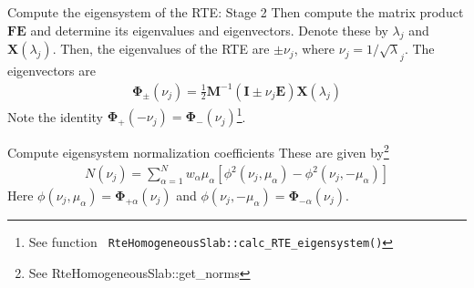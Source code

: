 \documentclass[14]{beamer}
\newcommand{\mvec}[1]{\mathbf{#1}}
\newcommand{\gvec}[1]{\boldsymbol{#1}}
\begin{document}
\begin{frame}{Compute the eigensystem of the RTE: Stage 2}
  Then compute the matrix product $\mvec{F}\mvec{E}$ and determine its
  eigenvalues and eigenvectors. Denote these by $\lambda_j$ and
  $\mvec{X}(\lambda_j)$.  Then, the eigenvalues of the RTE are $\pm
  \nu_j$, where $\nu_j = 1/\sqrt\lambda_j$. The eigenvectors are
  \begin{align}
    \gvec{\Phi}_\pm (\nu_j)
    = \frac{1}{2}\mvec{M}^{-1}
    (\mvec{I} \pm \nu_j\mvec{E})\mvec{X}(\lambda_j)
  \end{align}
  Note the identity $\gvec{\Phi}_+(-\nu_j) =
  \gvec{\Phi}_-(\nu_j)$\footnote{See function {\tt
      RteHomogeneousSlab::calc\_RTE\_eigensystem()}}.
\end{frame}

\begin{frame}{Compute eigensystem normalization coefficients}
  These are given by\footnote{See RteHomogeneousSlab::get\_norms}
  \begin{align}
    N(\nu_j) = \sum_{\alpha=1}^N
    w_\alpha \mu_\alpha
    \left[
      \phi^2(\nu_j,\mu_\alpha) - \phi^2(\nu_j,-\mu_\alpha)
    \right]
  \end{align}
  Here $\phi(\nu_j,\mu_\alpha) = \gvec{\Phi}_{+\alpha}(\nu_j)$ and
  $\phi(\nu_j,-\mu_\alpha) = \gvec{\Phi}_{-\alpha}(\nu_j)$.

\end{frame}
\end{document}
